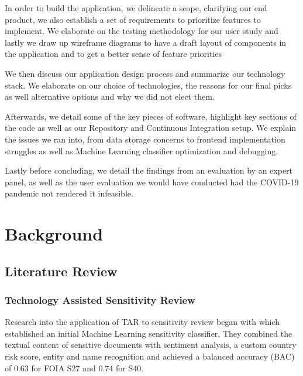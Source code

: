 \documentclass[\version]{l4proj}
\begin{document}
In order to build the application, we delineate a scope, clarifying our end product, we also establish a set of requirements to prioritize features to implement.
We elaborate on the testing methodology for our user study and lastly we draw up wireframe diagrams to have a draft layout of components in the application and to get a better sense of feature priorities

We then discuss our application design process and summarize our technology stack. We elaborate on our choice of technologies, the reasons for our final picks as well alternative options and why we did not elect them.

Afterwards, we detail some of the key pieces of software, highlight key sections of the code as well as our Repository and Continuous Integration setup.
We explain the issues we ran into, from data storage concerns to frontend implementation struggles as well as Machine Learning classifier optimization and debugging.

Lastly before concluding, we detail the findings from an evaluation by an expert panel, as well as the user evaluation we would have conducted had the COVID-19 pandemic not rendered it infeasible.


\chapter{Background}

\section{Literature Review}

\subsection{Technology Assisted Sensitivity Review}

\autocite{sanchezDetectingSensitiveInformation2012}

Research into the application of TAR to sensitivity review began with \textcite{mcdonaldClassifierDigitalSensitivity2014} which established an initial Machine Learning sensitivity classifier.
They combined the textual content of sensitive documents with sentiment analysis, a custom country risk score, entity and name recognition and achieved a balanced accuracy (BAC) of 0.63 for FOIA S27 and 0.74 for S40.
\end{document}
